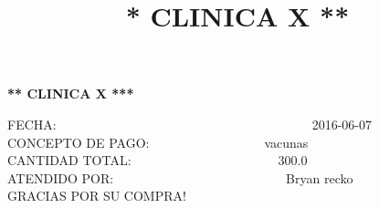 \documentclass[10pt,a4paper]{letter}
\title{\bf ** CLINICA X **}
\begin{document}
\begin{center}
{\scshape\LARGE \bf *** CLINICA X ***\par}

\end{center}

FECHA:\ \ \ \ \ \ \ \ \ \ \ \ \ \ \ \ \ \ \ \ \ \ \ \ \ \ \ \ \ \ \ \ \ \ \ \ \ \ \ \ 2016-06-07 \\
CONCEPTO DE PAGO:\ \ \ \ \ \ \ \ \ \ \ \ \ \ \ \ \ \ vacunas \\
CANTIDAD TOTAL:\ \ \ \ \ \ \ \ \ \ \ \ \ \ \ \ \ \ \ \ \ \ \ 300.0 \\
ATENDIDO POR:\ \ \ \ \ \ \ \ \ \ \ \ \ \ \ \ \ \ \ \ \ \ \ \ \ \ \ Bryan recko \\
GRACIAS POR SU COMPRA! \\ \\

 
\end{document}
